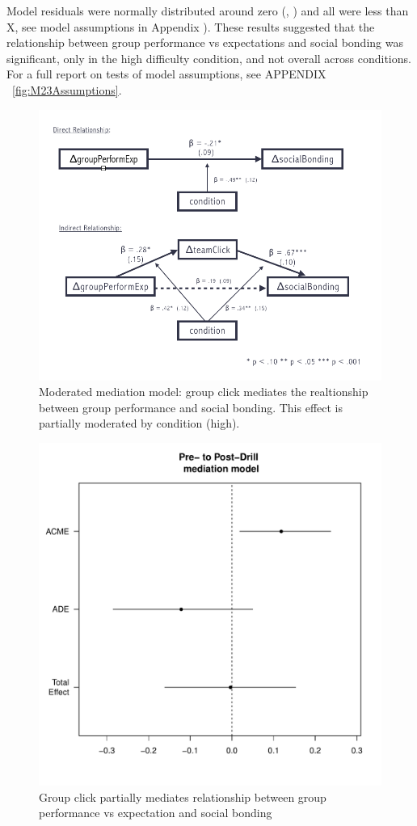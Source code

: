 Model residuals were normally distributed around zero (\resdist , \pvalue ) and all \cooksD were less than X, see model assumptions in Appendix  ).  These results suggested that the relationship between  group performance vs expectations and social bonding was significant, only in the high difficulty condition, and not overall across conditions. For a full report on tests of model assumptions, see APPENDIX ~\ref{fig:M23Assumptions}.











\begin{figure}
  \centering
  \includegraphics[width=0.9\linewidth,keepaspectratio] {images/prePostExperimentChangeModMedFigure}
  \caption{Moderated mediation model: group click mediates the realtionship between group performance and social bonding.  This effect is partially moderated by condition (high).}
  \label{fig:prePostExperimentChangeModMedFigure}
\end{figure}

\begin{figure}
  \centering
  \includegraphics[width=0.5\linewidth,keepaspectratio] {images/groupPerfExpClickChangeMedPlot}
  \caption{Group click partially mediates relationship between group performance vs expectation and social bonding}
  \label{fig:groupPerfExpClickChangeMedPlot}
\end{figure}

